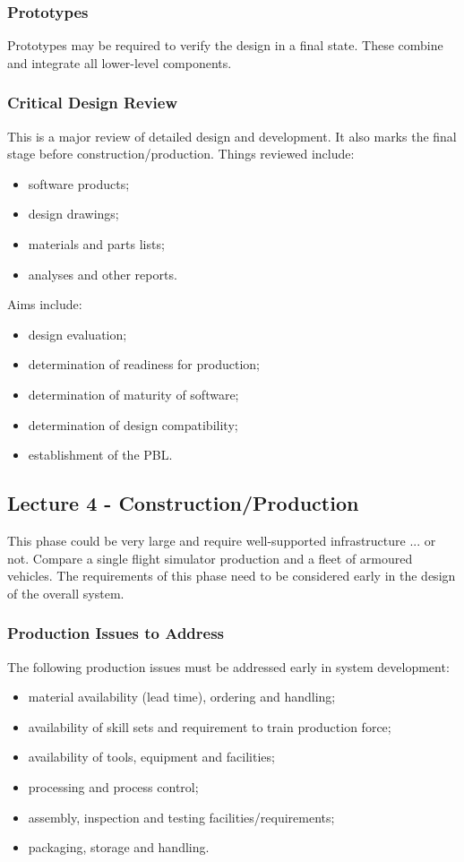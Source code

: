 \documentclass[journal]{IEEEtran}
\begin{document}
\subsubsection{\textbf{Prototypes}}
Prototypes may be required to verify the design in a final state. These combine and integrate all lower-level components.
\subsubsection{\textbf{Critical Design Review}}
This is a major review of detailed design and development. It also marks the final stage before construction/production. Things reviewed include:
\begin{itemize}
	\item software products;
	\item design drawings;
	\item materials and parts lists;
	\item analyses and other reports.
\end{itemize}
Aims include:
\begin{itemize}
	\item design evaluation;
	\item determination of readiness for production;
	\item determination of maturity of software;
	\item determination of design compatibility;
	\item establishment of the PBL.
\end{itemize}
\subsection{\textbf{Lecture 4 - Construction/Production}}
This phase could be very large and require well-supported infrastructure ... or not. Compare a single flight simulator production and a fleet of armoured vehicles. The requirements of this phase need to be considered early in the design of the overall system.
\subsubsection{\textbf{Production Issues to Address}}
The following production issues must be addressed early in system development:
\begin{itemize}
	\item material availability (lead time), ordering and handling;
	\item availability of skill sets and requirement to train production force;
	\item availability of tools, equipment and facilities;
	\item processing and process control;
	\item assembly, inspection and testing facilities/requirements;
	\item packaging, storage and handling.
\end{itemize}
\end{document}
